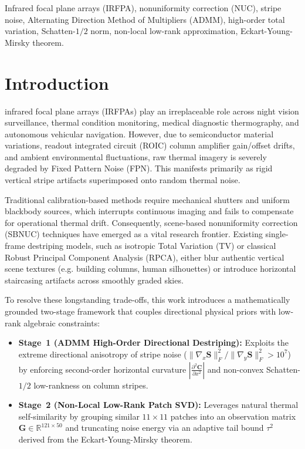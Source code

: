 \documentclass[lettersize,journal]{IEEEtran}
\begin{document}
\begin{IEEEkeywords}
Infrared focal plane arrays (IRFPA), nonuniformity correction (NUC), stripe noise, Alternating Direction Method of Multipliers (ADMM), high-order total variation, Schatten-$1/2$ norm, non-local low-rank approximation, Eckart-Young-Mirsky theorem.
\end{IEEEkeywords}

\section{Introduction}
 infrared focal plane arrays (IRFPAs) play an irreplaceable role across night vision surveillance, thermal condition monitoring, medical diagnostic thermography, and autonomous vehicular navigation. However, due to semiconductor material variations, readout integrated circuit (ROIC) column amplifier gain/offset drifts, and ambient environmental fluctuations, raw thermal imagery is severely degraded by Fixed Pattern Noise (FPN). This manifests primarily as rigid vertical stripe artifacts superimposed onto random thermal noise.

Traditional calibration-based methods require mechanical shutters and uniform blackbody sources, which interrupts continuous imaging and fails to compensate for operational thermal drift. Consequently, scene-based nonuniformity correction (SBNUC) techniques have emerged as a vital research frontier. Existing single-frame destriping models, such as isotropic Total Variation (TV) or classical Robust Principal Component Analysis (RPCA), either blur authentic vertical scene textures (e.g. building columns, human silhouettes) or introduce horizontal staircasing artifacts across smoothly graded skies.

To resolve these longstanding trade-offs, this work introduces a mathematically grounded two-stage framework that couples directional physical priors with low-rank algebraic constraints:
\begin{itemize}
    \item \textbf{Stage~1 (ADMM High-Order Directional Destriping):} Exploits the extreme directional anisotropy of stripe noise ($\|\nabla_x \mathbf{S}\|_F^2 / \|\nabla_y \mathbf{S}\|_F^2 > 10^7$) by enforcing second-order horizontal curvature $|\frac{\partial^2 \mathbf{C}}{\partial x^2}|$ and non-convex Schatten-$1/2$ low-rankness on column stripes.
    \item \textbf{Stage~2 (Non-Local Low-Rank Patch SVD):} Leverages natural thermal self-similarity by grouping similar $11 \times 11$ patches into an observation matrix $\mathbf{G} \in \mathbb{R}^{121 \times 50}$ and truncating noise energy via an adaptive tail bound $\tau^2$ derived from the Eckart-Young-Mirsky theorem.
\end{itemize}
\end{document}
